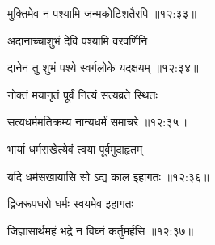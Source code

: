 
{\devanagarifont मुक्तिमेव न पश्यामि जन्मकोटिशतैरपि {॥१२:३३॥} \veg\dontdisplaylinenum }%

{\devanagarifont अदानाच्चाशुभं देवि पश्यामि वरवर्णिनि \thinspace{\dandab} \dontdisplaylinenum }%


{\devanagarifont दानेन तु शुभं पश्ये स्वर्गलोके यदक्षयम् {॥१२:३४॥} \veg\dontdisplaylinenum }%

{\devanagarifont नोक्तं मयानृतं पूर्वं नित्यं सत्यव्रते स्थितः \thinspace{\dandab} \dontdisplaylinenum }%


{\devanagarifont सत्यधर्ममतिक्रम्य नान्यधर्मं समाचरे {॥१२:३५॥} \veg\dontdisplaylinenum }%

{\devanagarifont भार्या धर्मसखेत्येवं त्वया पूर्वमुदाहृतम् \thinspace{\dandab} \dontdisplaylinenum }%


{\devanagarifont यदि धर्मसखायासि सो ऽद्य काल इहागतः {॥१२:३६॥} \veg\dontdisplaylinenum }%

{\devanagarifont द्विजरूपधरो धर्मः स्वयमेव इहागतः \thinspace{\dandab} \dontdisplaylinenum }%


{\devanagarifont जिज्ञासार्थमहं भद्रे न विघ्नं कर्तुमर्हसि {॥१२:३७॥} \veg\dontdisplaylinenum }%

